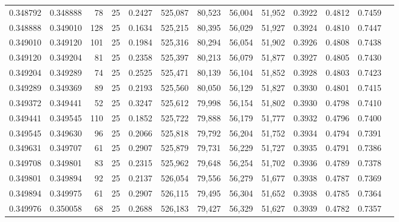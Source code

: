 \begin{tabular}{rrrrrrrrrrrrr}
0.348792 & 0.348888 &    78 &  25 &                                     0.2427 & 525,087 &  80,523 &  56,004 &  51,952 & 0.3922 & 0.4812 & 0.7459 \\
0.348888 & 0.349010 &   128 &  25 &                                     0.1634 & 525,215 &  80,395 &  56,029 &  51,927 & 0.3924 & 0.4810 & 0.7447 \\
0.349010 & 0.349120 &   101 &  25 &                                     0.1984 & 525,316 &  80,294 &  56,054 &  51,902 & 0.3926 & 0.4808 & 0.7438 \\
0.349120 & 0.349204 &    81 &  25 &                                     0.2358 & 525,397 &  80,213 &  56,079 &  51,877 & 0.3927 & 0.4805 & 0.7430 \\
0.349204 & 0.349289 &    74 &  25 &                                     0.2525 & 525,471 &  80,139 &  56,104 &  51,852 & 0.3928 & 0.4803 & 0.7423 \\
0.349289 & 0.349369 &    89 &  25 &                                     0.2193 & 525,560 &  80,050 &  56,129 &  51,827 & 0.3930 & 0.4801 & 0.7415 \\
0.349372 & 0.349441 &    52 &  25 &                                     0.3247 & 525,612 &  79,998 &  56,154 &  51,802 & 0.3930 & 0.4798 & 0.7410 \\
0.349441 & 0.349545 &   110 &  25 &                                     0.1852 & 525,722 &  79,888 &  56,179 &  51,777 & 0.3932 & 0.4796 & 0.7400 \\
0.349545 & 0.349630 &    96 &  25 &                                     0.2066 & 525,818 &  79,792 &  56,204 &  51,752 & 0.3934 & 0.4794 & 0.7391 \\
0.349631 & 0.349707 &    61 &  25 &                                     0.2907 & 525,879 &  79,731 &  56,229 &  51,727 & 0.3935 & 0.4791 & 0.7386 \\
0.349708 & 0.349801 &    83 &  25 &                                     0.2315 & 525,962 &  79,648 &  56,254 &  51,702 & 0.3936 & 0.4789 & 0.7378 \\
0.349801 & 0.349894 &    92 &  25 &                                     0.2137 & 526,054 &  79,556 &  56,279 &  51,677 & 0.3938 & 0.4787 & 0.7369 \\
0.349894 & 0.349975 &    61 &  25 &                                     0.2907 & 526,115 &  79,495 &  56,304 &  51,652 & 0.3938 & 0.4785 & 0.7364 \\
0.349976 & 0.350058 &    68 &  25 &                                     0.2688 & 526,183 &  79,427 &  56,329 &  51,627 & 0.3939 & 0.4782 & 0.7357 \\

\end{tabular}
